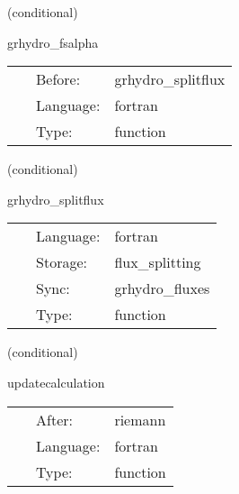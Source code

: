 \vspace{5mm}

   (conditional) 

\hspace{5mm} grhydro\_fsalpha 

\hspace{5mm}{\it compute the maximum characteristic speeds } 


\hspace{5mm}

 \begin{tabular*}{160mm}{cll} 
~ & Before:  & grhydro\_splitflux \\ 
~ & Language:  & fortran \\ 
~ & Type:  & function \\ 
\end{tabular*} 


\vspace{5mm}

   (conditional) 

\hspace{5mm} grhydro\_splitflux 

\hspace{5mm}{\it compute the fluxes using weno5 fd + lax-friedrichs splitting } 


\hspace{5mm}

 \begin{tabular*}{160mm}{cll} 
~ & Language:  & fortran \\ 
~ & Storage:  & flux\_splitting \\ 
~ & Sync:  & grhydro\_fluxes \\ 
~ & Type:  & function \\ 
\end{tabular*} 


\vspace{5mm}

   (conditional) 

\hspace{5mm} updatecalculation 

\hspace{5mm}{\it calculate the update term from the fluxes } 


\hspace{5mm}

 \begin{tabular*}{160mm}{cll} 
~ & After:  & riemann \\ 
~ & Language:  & fortran \\ 
~ & Type:  & function \\ 
\end{tabular*} 


